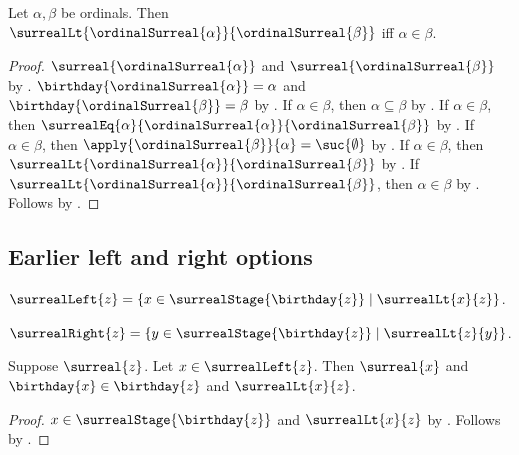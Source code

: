 \begin{theorem}\label{ordinal_surreal_lt_iff}
    Let $\alpha,\beta$ be ordinals.
    Then $\surrealLt{\ordinalSurreal{\alpha}}{\ordinalSurreal{\beta}}$
        iff $\alpha\in\beta$.
\end{theorem}
\begin{proof}
    $\surreal{\ordinalSurreal{\alpha}}$ and
        $\surreal{\ordinalSurreal{\beta}}$
        by .
    $\birthday{\ordinalSurreal{\alpha}}=\alpha$ and
        $\birthday{\ordinalSurreal{\beta}}=\beta$
        by .
    If $\alpha\in\beta$, then $\alpha\subseteq\beta$
        by .
    If $\alpha\in\beta$, then
        $\surrealEq{\alpha}
            {\ordinalSurreal{\alpha}}{\ordinalSurreal{\beta}}$
        by .
    If $\alpha\in\beta$, then
        $\apply{\ordinalSurreal{\beta}}{\alpha}=\suc{\emptyset}$
        by .
    If $\alpha\in\beta$, then
        $\surrealLt{\ordinalSurreal{\alpha}}{\ordinalSurreal{\beta}}$
        by .
    If $\surrealLt{\ordinalSurreal{\alpha}}{\ordinalSurreal{\beta}}$,
        then $\alpha\in\beta$
        by .
    Follows by \auto.
\end{proof}

\subsection{Earlier left and right options}

\begin{definition}\label{surreal_left}
    $\surrealLeft{z}=\{x\in\surrealStage{\birthday{z}}\mid
        \surrealLt{x}{z}\}$.
\end{definition}

\begin{definition}\label{surreal_right}
    $\surrealRight{z}=\{y\in\surrealStage{\birthday{z}}\mid
        \surrealLt{z}{y}\}$.
\end{definition}

\begin{proposition}\label{surreal_left_elim}
    Suppose $\surreal{z}$.
    Let $x\in\surrealLeft{z}$.
    Then $\surreal{x}$ and $\birthday{x}\in\birthday{z}$ and
        $\surrealLt{x}{z}$.
\end{proposition}
\begin{proof}
    $x\in\surrealStage{\birthday{z}}$ and $\surrealLt{x}{z}$
        by .
    Follows by
        .
\end{proof}

